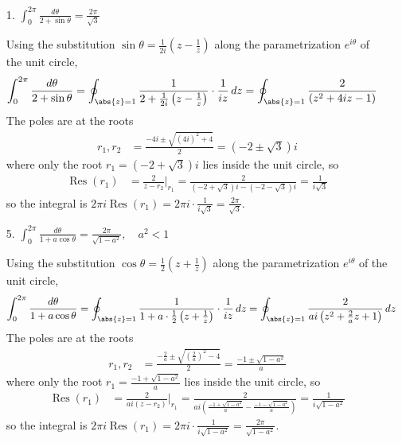 \documentclass{article}
\DeclareMathOperator{\Res}{Res}
\begin{document}
\begin{itemize}
	\item[1.] $\int_0^{2\pi} \frac{d\theta}{2+\sin \theta} = \frac{2\pi}{\sqrt{3}}$
		\begin{soln}
			Using the substitution $\sin \theta = \frac{1}{2i}\left( z-\frac{1}{z} \right)$ along the parametrization $e^{i\theta}$ of the unit circle, 
			\begin{align*}
				\int_0^{2\pi} \frac{d\theta}{2+\sin \theta} &= \oint_{\abs{z}=1} \frac{1}{2+\frac{1}{2i}\left( z-\frac{1}{z} \right)}\cdot \frac{1}{iz}\, dz = \oint_{\abs{z}=1} \frac{2}{(z^2+4iz-1)}
			\end{align*}
			The poles are at the roots
			\begin{align*}
				r_1, r_2 &= \frac{-4i\pm\sqrt{(4i)^2+4}}{2} = \left( -2\pm \sqrt{3} \right)i
			\end{align*}
			where only the root $r_1=\left( -2+\sqrt{3} \right)i$ lies inside the unit circle, so
			\begin{align*}
				\Res(r_1) &= \frac{2}{z-r_2}\bigg\vert_{r_1} = \frac{2}{\left( -2+\sqrt{3} \right)i - \left( -2-\sqrt{3} \right)i} = \frac{1}{i\sqrt{3}}
			\end{align*}
			so the integral is $2\pi i\Res(r_1)=2\pi i\cdot \frac{1}{i\sqrt{3}} = \frac{2\pi}{\sqrt{3}}.$
		\end{soln}

	\item[5.] $\int_0^{2\pi} \frac{d\theta}{1+a\cos \theta} = \frac{2\pi}{\sqrt{1-a^2}}, \quad a^2<1$
		\begin{soln}
			Using the substitution $\cos \theta = \frac{1}{2}\left( z+\frac{1}{z} \right)$ along the parametrization $e^{i\theta}$ of the unit circle,
			\begin{align*}
				\int_0^{2\pi} \frac{d\theta}{1+a\cos\theta} &= \oint_{\abs{z}=1} \frac{1}{1+a\cdot\frac{1}{2}\left( z+ \frac{1}{z}\right)}\cdot \frac{1}{iz}\, dz = \oint_{\abs{z}=1} \frac{2}{ai\left( z^2+\frac{2}{a}z + 1 \right)}\, dz
			\end{align*}
			The poles are at the roots
			\begin{align*}
				r_1, r_2 &= \frac{-\frac{2}{a} \pm \sqrt{\left( \frac{2}{a} \right)^2-4}}{2} = \frac{-1\pm \sqrt{1-a^2}}{a}
			\end{align*}
			where only the root $r_1=\frac{-1+\sqrt{1-a^2}}{a}$ lies inside the unit circle, so
			\begin{align*}
				\Res(r_1) &= \frac{2}{ai(z-r_2)}\bigg\vert_{r_1} = \frac{2}{ai\left( \frac{-1+\sqrt{1-a^2}}{a} - \frac{-1-\sqrt{1-a^2}}{a} \right)} = \frac{1}{i\sqrt{1-a^2}}
			\end{align*}
			so the integral is $2\pi i\Res(r_1) = 2\pi i\cdot \frac{1}{i\sqrt{1-a^2}} = \frac{2\pi}{\sqrt{1-a^2}}.$
		\end{soln}


\end{itemize}
\end{document}
